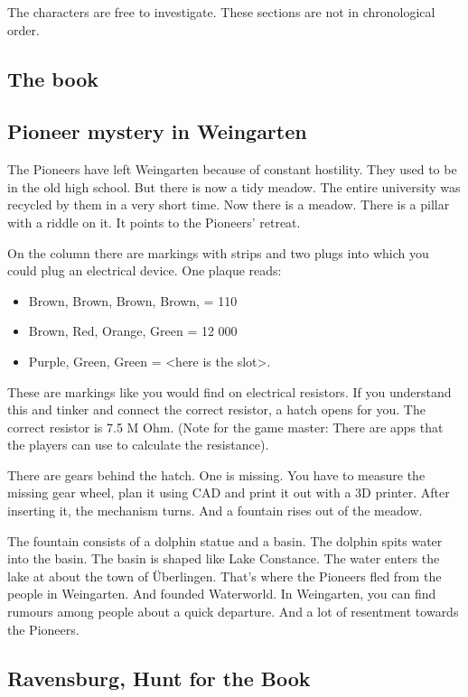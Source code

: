 The characters are free to investigate. These sections are not in chronological order.

\subsection{The book}

\subsection{Pioneer mystery in Weingarten}

The Pioneers have left Weingarten because of constant hostility. They used to be in the old high school. But there is now a tidy meadow. The entire university was recycled by them in a very short time. Now there is a meadow.
There is a pillar with a riddle on it. It points to the Pioneers' retreat.

On the column there are markings with strips and two plugs into which you could plug an electrical device. One plaque reads:

\begin{itemize}
    \item Brown, Brown, Brown, Brown, = 110
    \item Brown, Red, Orange, Green = 12 000
    \item Purple, Green, Green = <here is the slot>.
\end{itemize}

These are markings like you would find on electrical resistors. If you understand this and tinker and connect the correct resistor, a hatch opens for you. The correct resistor is 7.5 M Ohm.
(Note for the game master: There are apps that the players can use to calculate the resistance).

There are gears behind the hatch. One is missing.
You have to measure the missing gear wheel, plan it using CAD and print it out with a 3D printer. After inserting it, the mechanism turns. And a fountain rises out of the meadow.

The fountain consists of a dolphin statue and a basin.
The dolphin spits water into the basin. The basin is shaped like Lake Constance. The water enters the lake at about the town of Überlingen.
That's where the Pioneers fled from the people in Weingarten. And founded Waterworld.
In Weingarten, you can find rumours among people about a quick departure. And a lot of resentment towards the Pioneers.

\subsection{Ravensburg, Hunt for the Book}

